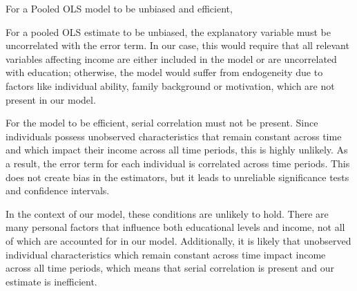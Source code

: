 
For a Pooled OLS model to be unbiased and efficient, 


For a pooled OLS estimate to be unbiased, the explanatory variable must be uncorrelated with the error term. In our case, this would require that all relevant variables affecting income are either included in the model or are uncorrelated with education; otherwise, the model would suffer from endogeneity due to factors like individual ability, family background or motivation, which are not present in our model.

For the model to be efficient, serial correlation must not be present. Since individuals possess unobserved characteristics that remain constant across time and which impact their income across all time periods, this is highly unlikely. As a result, the error term for each individual is correlated across time periods. This does not create bias in the estimators, but it leads to unreliable significance tests and confidence intervals.

In the context of our model, these conditions are unlikely to hold. There are many personal factors that influence both educational levels and income, not all of which are accounted for in our model. Additionally, it is likely that unobserved individual characteristics which remain constant across time impact income across all time periods, which means that serial correlation is present and our estimate is inefficient.